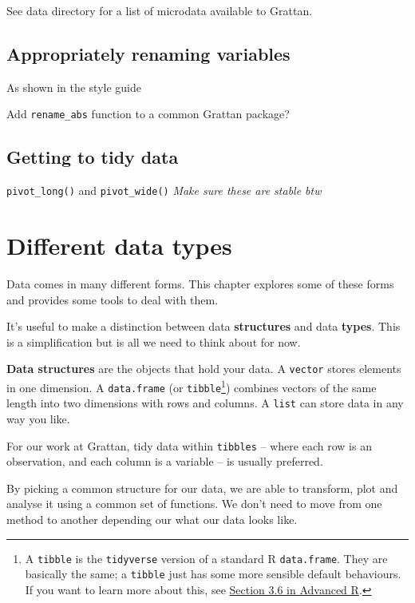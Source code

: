 \documentclass[
]{book}
\begin{document}
See data directory for a list of microdata available to Grattan.

\hypertarget{appropriately-renaming-variables}{%
\section{Appropriately renaming variables}\label{appropriately-renaming-variables}}

As shown in the style guide

Add \texttt{rename\_abs} function to a common Grattan package?

\hypertarget{getting-to-tidy-data}{%
\section{Getting to tidy data}\label{getting-to-tidy-data}}

\texttt{pivot\_long()} and \texttt{pivot\_wide()}
\emph{Make sure these are stable btw}

\hypertarget{different-data-types}{%
\chapter{Different data types}\label{different-data-types}}

Data comes in many different forms. This chapter explores some of these forms and provides some tools to deal with them.

It's useful to make a distinction between data \textbf{structures} and data \textbf{types}. This is a simplification but is all we need to think about for now.

\textbf{Data structures} are the objects that hold your data. A \texttt{vector} stores elements in one dimension. A \texttt{data.frame} (or \texttt{tibble}\footnote{A \texttt{tibble} is the \texttt{tidyverse} version of a standard R \texttt{data.frame}. They are basically the same; a \texttt{tibble} just has some more sensible default behaviours. If you want to learn more about this, see \href{https://adv-r.hadley.nz/vectors-chap.html\#tibble}{Section 3.6 in Advanced R}.}) combines vectors of the same length into two dimensions with rows and columns. A \texttt{list} can store data in any way you like.

For our work at Grattan, tidy data within \texttt{tibbles} -- where each row is an observation, and each column is a variable -- is usually preferred.

By picking a common structure for our data, we are able to transform, plot and analyse it using a common set of functions. We don't need to move from one method to another depending our what our data looks like.
\end{document}
